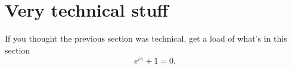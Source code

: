 \chapter{Very technical stuff}
If you thought the previous section was technical, get a load of what's in this section
$$
e^{i\pi}+1=0.
$$